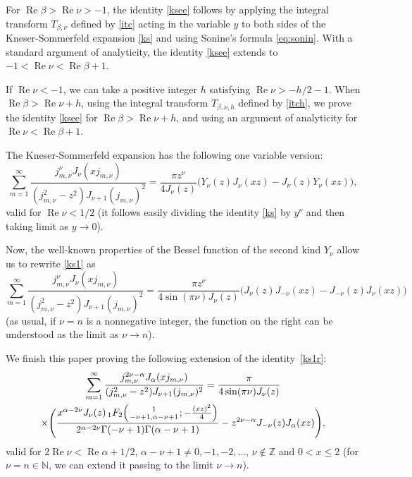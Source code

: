 \documentclass[10pt,leqno,a4paper]{article}
\theoremstyle{plain}
\newcommand{\ZZ}{\mathbb{Z}}
\newcommand{\NN}{\mathbb{N}}
\renewcommand{\Re}{\operatorname{Re}}
\numberwithin{equation}{section}
\newcommand{\unoFFdos}[3]{{}_{1}F_{2}%
  \mathopen{}\left(\genfrac{}{}{0pt}{}{#1}{#2};#3\right)\mathclose{}}
\begin{document}
For $\Re \beta> \Re \nu>-1$, the identity \eqref{ksee} follows by applying the integral transform $T_{\beta,\nu}$ defined by \eqref{itc} acting in the variable $y$ to both sides of the Kneser-Sommerfeld expansion \eqref{ks} and using Sonine's formula \eqref{eq:sonin}. With a standard argument of analyticity, the identity \eqref{ksee} extends to $-1 < \Re \nu < \Re \beta + 1$.

If $\Re \nu<-1$, we can take a positive integer $h$ satisfying $\Re \nu > - h/2 - 1$. When $\Re\beta > \Re\nu + h$, using the integral transform $T_{\beta,\nu,h}$ defined by \eqref{itch}, we prove the identity \eqref{ksee} for $\Re \beta > \Re \nu + h$, and using an argument of analyticity for $\Re\nu<\Re \beta+1$.

The Kneser-Sommerfeld expansion has the following one variable version:
\begin{equation}
\label{ks1}
   \sum_{m=1}^\infty
   \frac{j_{m,\nu}^\nu J_\nu(x j_{m,\nu})}{(j_{m,\nu}^{2}-z^2) J_{\nu+1}(j_{m,\nu})^2}
   = \frac{\pi z^\nu}{4 J_\nu(z)} \big(Y_\nu(z)J_\nu(xz)-J_\nu(z)Y_\nu(xz)\big),
\end{equation}
valid for $\Re \nu<1/2$ (it follows easily dividing the identity \eqref{ks} by $y^\nu$ and then taking limit as $y\to 0$).

Now, the well-known properties of the Bessel function of the second kind $Y_\nu$ allow us to rewrite \eqref{ks1} as
\begin{equation}
\label{ks1r}
   \sum_{m=1}^\infty
   \frac{j_{m,\nu}^\nu J_\nu(x j_{m,\nu})}{(j_{m,\nu}^{2}-z^2) J_{\nu+1}(j_{m,\nu})^2}
   = \frac{\pi z^\nu}{4\sin(\pi\nu)J_\nu(z)}
   \big(J_\nu(z)J_{-\nu}(xz)-J_{-\nu}(z)J_\nu(xz)\big)
\end{equation}
(as usual, if $\nu=n$ is a nonnegative integer, the function on the right can be understood as the limit as $\nu\to n$).

We finish this paper proving the following extension of the identity~\eqref{ks1r}:
\begin{multline}
\label{ks1re}
   \sum_{m=1}^\infty
   \frac{j_{m,\nu}^{2\nu-\alpha} J_\alpha(x j_{m,\nu})}
   {(j_{m,\nu}^{2}-z^2) J_{\nu+1}(j_{m,\nu})^2}
   =
   \frac{\pi }{4\sin(\pi\nu)J_\nu(z)}
   \\
   \times \Bigg(
   \frac{x^{\alpha-2\nu} J_\nu(z) \,\unoFFdos{1}{-\nu+1,\alpha-\nu+1}{-\frac{(xz)^2}{4}}}
   {2^{\alpha-2\nu}\Gamma(-\nu+1)\Gamma(\alpha-\nu+1)}
   - z^{2\nu-\alpha} J_{-\nu}(z) J_\alpha(xz)
   \Bigg),
\end{multline}
valid for $2\Re \nu < \Re \alpha + 1/2$, $\alpha - \nu + 1 \neq 0,-1,-2,\dots$, $\nu\notin \ZZ$ and $0< x\leq 2$ (for $\nu=n\in \NN$, we can extend it passing to the limit $\nu\to n$).
\end{document}
